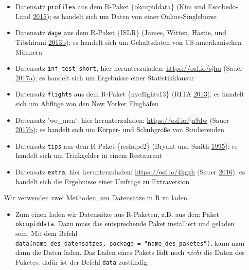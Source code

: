 \documentclass[12pt,ngerman,]{book}
\providecommand{\tightlist}{%
  \setlength{\itemsep}{0pt}\setlength{\parskip}{0pt}}
\begin{document}
\begin{itemize}
\tightlist
\item
  Datensatz \texttt{profiles} aus dem R-Paket \{okcupiddata\} (Kim und
  Escobedo-Land \protect\hyperlink{ref-kim2015okcupid}{2015}); es
  handelt sich um Daten von einer Online-Singlebörse
\item
  Datensatz \texttt{Wage} aus dem R-Paket \{ISLR\} (James, Witten,
  Hastie, und Tibshirani
  \protect\hyperlink{ref-introstatlearning}{2013}\protect\hyperlink{ref-introstatlearning}{b});
  es handelt sich um Gehaltsdaten von US-amerikanischen Männern
\item
  Datensatz \texttt{inf\_test\_short}, hier herunterzuladen:
  \url{https://osf.io/sjhu} (Sauer
  \protect\hyperlink{ref-Sauer_2017}{2017}\protect\hyperlink{ref-Sauer_2017}{a});
  es handelt sich um Ergebnisse einer Statistikklausur
\item
  Datensatz \texttt{flights} aus dem R-Paket \{nycflights13\} (RITA
  \protect\hyperlink{ref-nycflights13}{2013}); es handelt sich um
  Abflüge von den New Yorker Flughäfen
\item
  Datensatz 'wo\_men`, hier herunterzuladen: \url{https://osf.io/ja9dw}
  (Sauer
  \protect\hyperlink{ref-Sauer_2017a}{2017}\protect\hyperlink{ref-Sauer_2017a}{b});
  es handelt sich um Körper- und Schuhgröße von Studierenden
\item
  Datensatz \texttt{tips} aus dem R-Paket \{reshape2\} (Bryant und Smith
  \protect\hyperlink{ref-bryant1995practical}{1995}); es handelt sich um
  Trinkgelder in einem Restaurant
\item
  Datensatz \texttt{extra}, hier herunterzuladen:
  \url{https://osf.io/4kgzh} (Sauer
  \protect\hyperlink{ref-Sauer_2016}{2016}); es handelt sich die
  Ergebnisse einer Umfrage zu Extraversion
\end{itemize}

Wir verwenden zwei Methoden, um Datensätze in R zu laden.

\begin{itemize}
\tightlist
\item
  Zum einen laden wir Datensätze aus R-Paketen, z.B. aus dem Paket
  \texttt{okcupiddata}. Dazu muss das entsprechende Paket installiert
  und geladen sein. Mit dem Befehl
  \texttt{data(name\_des\_datensatzes,\ package\ =\ "name\_des\_paketes")},
  kann man dann die Daten laden. Das Laden eines Pakets lädt noch
  \emph{nicht} die Daten des Paketes; dafür ist der Befehl \texttt{data}
  zuständig.
\end{itemize}
\end{document}
